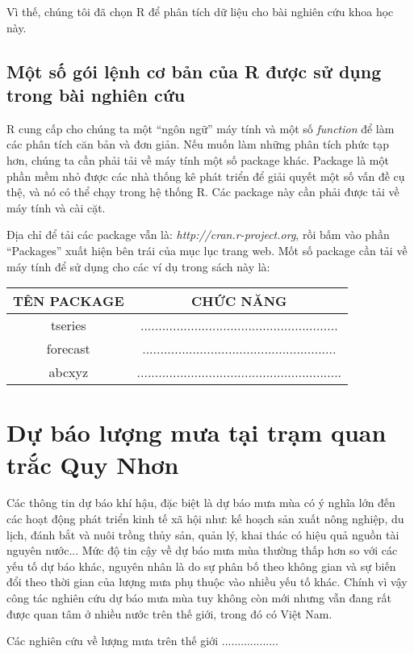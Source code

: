 \documentclass[12pt, a4paper,oneside]{book}
\theoremstyle{definition}
\begin{document}
Vì thế, chúng tôi đã chọn R để phân tích dữ liệu cho bài nghiên cứu khoa học này.
\subsection*{Một số gói lệnh cơ bản của R được sử dụng trong bài nghiên cứu}

R cung cấp cho chúng ta một “ngôn ngữ” máy tính và một số \textit{function} để làm các phân tích căn bản và đơn giản. Nếu muốn làm những phân tích phức tạp hơn, chúng ta cần phải tải về máy tính một số package khác. Package là một phần mềm nhỏ được các nhà thống kê phát triển để giải quyết một số vấn đề cụ thệ, và nó có thể chạy trong hệ thống R. Các package này cần phải được tải về máy tính và cài cặt.

Địa chỉ để tải các package vẫn là: \textit{http://cran.r-project.org}, rồi bấm vào phần “Packages” xuất hiện bên trái của mục lục trang web. Mốt số package cần tải về máy tính để sử dụng cho các ví dụ trong sách này là: 
\begin{center}
	\begin{tabular}{ |c|c|}
		\hline
		TÊN PACKAGE& CHỨC NĂNG\\
		\hline
		tseries & .......................................................\\
		forecast & ......................................................  \\
		abcxyz & .........................................................\\
		\hline
	\end{tabular}
\end{center}
\section{Dự báo lượng mưa tại trạm quan trắc Quy Nhơn}
Các thông tin dự báo khí hậu, đặc biệt là dự báo mưa mùa có ý nghĩa lớn đến các hoạt động phát triển kinh tế xã hội như: kế hoạch sản xuất nông nghiệp, du lịch, đánh bắt và nuôi trồng thủy sản, quản lý, khai thác có hiệu quả nguồn tài nguyên nước... Mức độ tin cậy về dự báo mưa mùa thường thấp hơn so với các yếu tố dự báo khác, nguyên nhân là do sự phân bố theo không gian và sự biến đổi theo thời gian của lượng mưa phụ thuộc vào nhiều yếu tố khác. Chính vì vậy công tác nghiên cứu dự báo mưa mùa tuy không còn mới nhưng vẫn đang rất được quan tâm ở nhiều nước trên thế giới, trong đó có Việt Nam.

Các nghiên cứu về lượng mưa trên thế giới ..................
\end{document}

